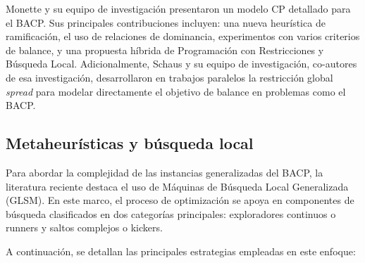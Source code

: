 \documentclass[letter, 10pt]{article}
\begin{document}
Monette y su equipo de investigaci\'on \cite{Monette2007} presentaron un modelo CP detallado para el BACP. Sus principales contribuciones incluyen: una nueva heur\'istica de ramificaci\'on, el uso de relaciones de dominancia, experimentos con varios criterios de balance, y una propuesta h\'ibrida de Programaci\'on con Restricciones y B\'usqueda Local. Adicionalmente, Schaus y su equipo de investigaci\'on, co-autores de esa investigaci\'on, desarrollaron en trabajos paralelos la restricci\'on global \textit{spread} para modelar directamente el objetivo de balance en problemas como el BACP.



\subsection{Metaheur\'isticas y b\'usqueda local}
Para abordar la complejidad de las instancias generalizadas del BACP, la literatura reciente destaca el uso de M\'aquinas de B\'usqueda Local Generalizada (GLSM). En este marco, el proceso de optimizaci\'on se apoya en componentes de b\'usqueda clasificados en dos categor\'ias principales: exploradores continuos o runners y saltos complejos o kickers.

A continuaci\'on, se detallan las principales estrategias empleadas en este enfoque:
\end{document}
